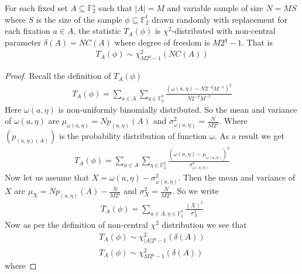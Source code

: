 \begin{corollary} \label{corollary:T_A_phi}
For each fixed set $A \subseteq \mathbb{F}_{2}^{s}$ such that $|A| = M$ and variable sample of size $N = MS$ where $S$ is the size of the sample $\phi \subseteq \mathbb{F}_2^t$ drawn randomly with replacement for each fixation $a \in A$, the statistic $T_{A}(\phi)$ is $\chi^2$-distributed with non-central parameter $\delta(A)=NC(A)$ where degree of freedom is $M2^q-1$. That is
\begin{eqnarray*}
T_{A}(\phi) \sim \chi^2_{M2^{q}-1}(NC(A))
\end{eqnarray*}
\end{corollary}
\begin{proof}
Recall the definition of $T_{A}(\phi)$
\begin{eqnarray*}
T_{A}(\phi) = \displaystyle\sum_{a \in A}\displaystyle\sum_{\eta \in \mathbb{F}_{2}^{q}} \frac{(\omega(a,\eta) - N2^{-q}M^{-1})^2}{N2^{-q}M^{-1}}
\end{eqnarray*}
Here $\omega(a,\eta)$ is non-uniformly binomially distributed. So the mean and variance of $\omega(a,\eta)$ are $\mu_{\omega(a,\eta)} = Np_{\left( a,\eta \right)}\left(A\right)$ and $\sigma^{2}_{\omega(a,\eta)} = \frac{N}{M2^{q}}$. Where $\left( p_{\left(a,\eta\right)\left(A\right)} \right)$ is the probability distribution of function $\omega$. As a result we get
\begin{eqnarray*}
T_{A}(\phi) = \displaystyle\sum_{a \in A}\displaystyle\sum_{\eta \in \mathbb{F}_{2}^{q}} \frac{(\omega(a,\eta) - \mu_{\omega(a,\eta)})^2}{\sigma^{2}_{\omega(a,\eta)}}
\end{eqnarray*} Now let us assume that $X = \omega(a,\eta) - \sigma^{2}_{\omega(a,\eta)}$. Then the mean and variance of $X$ are $\mu_{X} = Np_{\left(a,\eta\right)}(A) - \frac{N}{M2^q}$ and $\sigma^{2}_{X} = \frac{N}{M2^q}$. So we write 
\begin{eqnarray*}
T_{A}(\phi) = \displaystyle\sum_{a \in A,\eta \in \mathbb{F}_{2}^{q}}\frac{(X)^2}{\sigma^{2}_{X}}
\end{eqnarray*} Now as per the definition of non-central $\chi^2$ distribution we see that
\begin{eqnarray*}
T_{A}(\phi) \sim \chi^{2}_{|A|2^q-1}(\delta(A))\\
T_{A}(\phi) \sim \chi^{2}_{M2^q-1}(\delta(A))
\end{eqnarray*} where 

\end{proof}
